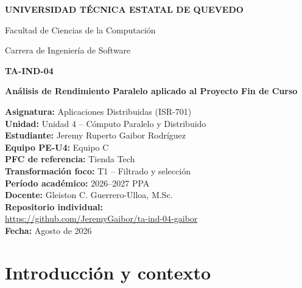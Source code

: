 \documentclass[12pt,a4paper]{article}
\begin{document}
\begin{titlepage}
    \centering

    {\Large\textbf{UNIVERSIDAD TÉCNICA ESTATAL DE QUEVEDO}\par}
    \vspace{0.4cm}

    {\large Facultad de Ciencias de la Computación\par}
    {\large Carrera de Ingeniería de Software\par}

    \vfill

    {\Large\textbf{TA-IND-04}\par}
    \vspace{0.4cm}

    {\LARGE\textbf{Análisis de Rendimiento Paralelo aplicado al Proyecto Fin de Curso}\par}

    \vfill

    \begin{flushleft}
        \textbf{Asignatura:} Aplicaciones Distribuidas (ISR-701)\\[0.2cm]
        \textbf{Unidad:} Unidad 4 -- Cómputo Paralelo y Distribuido\\[0.2cm]
        \textbf{Estudiante:} Jeremy Ruperto Gaibor Rodríguez\\[0.2cm]
        \textbf{Equipo PE-U4:} Equipo C\\[0.2cm]
        \textbf{PFC de referencia:} Tienda Tech\\[0.2cm]
        \textbf{Transformación foco:} T1 -- Filtrado y selección\\[0.2cm]
        \textbf{Período académico:} 2026--2027 PPA\\[0.2cm]
        \textbf{Docente:} Gleiston C. Guerrero-Ulloa, M.Sc.\\[0.2cm]
        \textbf{Repositorio individual:}\\
        \url{https://github.com/JeremyGaibor/ta-ind-04-gaibor}\\[0.2cm]
        \textbf{Fecha:} Agosto de 2026
    \end{flushleft}

    \vfill
\end{titlepage}

\section{Introducción y contexto}
\end{document}
